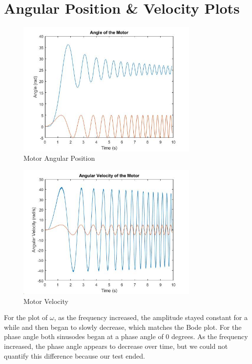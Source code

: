 \section{Angular Position \& Velocity Plots}

\begin{figure}[H]
	\centering
	\includegraphics[width=0.8\textwidth]{./figures/lab2_theta_with_input.jpg}
	\caption{Motor Angular Position}
	\label{fig:}
\end{figure}

\begin{figure}[H]
	\centering
	\includegraphics[width=0.8\textwidth]{./figures/lab2_omega_with_input.jpg}
	\caption{Motor Velocity}
	\label{fig:}
\end{figure}

For the plot of $\omega$, as the frequency increased, the amplitude stayed constant for a while and then began to slowly decrease, which matches the Bode plot. For the phase angle both sinusodes began at a phase angle of 0 degrees. As the frequency increased, the phase angle appears to decrease over time, but we could not quantify this difference because our test ended. 

